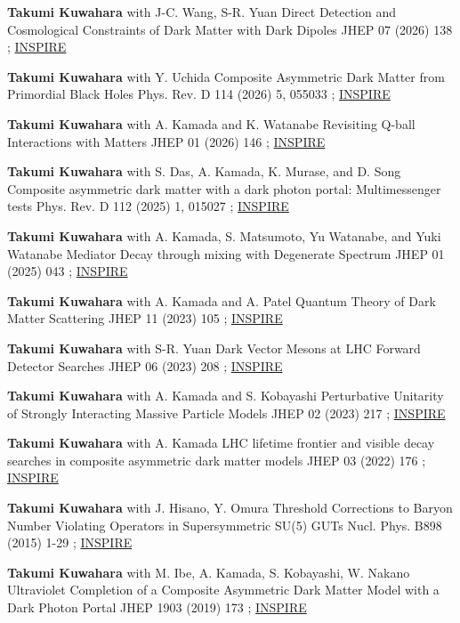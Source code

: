 \begin{publist}

\pubentry
  {\textbf{Takumi Kuwahara} with J-C. Wang, S-R. Yuan}
  {Direct Detection and Cosmological Constraints of Dark Matter with Dark Dipoles}
  {JHEP 07 (2026) 138}
  {; \href{https://inspirehep.net/literature/3117352}{INSPIRE}}

\pubentry
  {\textbf{Takumi Kuwahara} with Y. Uchida}
  {Composite Asymmetric Dark Matter from Primordial Black Holes}
  {Phys. Rev. D 114 (2026) 5, 055033}
  {; \href{https://inspirehep.net/literature/3085099}{INSPIRE}}

\pubentry
  {\textbf{Takumi Kuwahara} with A. Kamada and K. Watanabe}
  {Revisiting Q-ball Interactions with Matters}
  {JHEP 01 (2026) 146}
  {; \href{https://inspirehep.net/literature/2946508}{INSPIRE}}

\pubentry
  {\textbf{Takumi Kuwahara} with S. Das, A. Kamada, K. Murase, and D. Song}
  {Composite asymmetric dark matter with a dark photon portal: Multimessenger tests}
  {Phys. Rev. D 112 (2025) 1, 015027}
  {; \href{https://inspirehep.net/literature/2861921}{INSPIRE}}

\pubentry
  {\textbf{Takumi Kuwahara} with A. Kamada, S. Matsumoto, Yu Watanabe, and Yuki Watanabe}
  {Mediator Decay through mixing with Degenerate Spectrum}
  {JHEP 01 (2025) 043}
  {; \href{https://inspirehep.net/literature/2775864}{INSPIRE}}

\pubentry
  {\textbf{Takumi Kuwahara} with A. Kamada and A. Patel}
  {Quantum Theory of Dark Matter Scattering}
  {JHEP 11 (2023) 105}
  {; \href{https://inspirehep.net/literature/2647767}{INSPIRE}}

\pubentry
  {\textbf{Takumi Kuwahara} with S-R. Yuan}
  {Dark Vector Mesons at LHC Forward Detector Searches}
  {JHEP 06 (2023) 208}
  {; \href{https://inspirehep.net/literature/2639057}{INSPIRE}}

\pubentry
  {\textbf{Takumi Kuwahara} with A. Kamada and S. Kobayashi}
  {Perturbative Unitarity of Strongly Interacting Massive Particle Models}
  {JHEP 02 (2023) 217}
  {; \href{https://inspirehep.net/literature/2159849}{INSPIRE}}

\pubentry
  {\textbf{Takumi Kuwahara} with A. Kamada}
  {LHC lifetime frontier and visible decay searches in composite asymmetric dark matter models}
  {JHEP 03 (2022) 176}
  {; \href{https://inspirehep.net/literature/1982942}{INSPIRE}}

\pubentry
  {\textbf{Takumi Kuwahara} with J. Hisano, Y. Omura}
  {Threshold Corrections to Baryon Number Violating Operators in Supersymmetric SU(5) GUTs}
  {Nucl. Phys. B898 (2015) 1-29}
  {; \href{https://inspirehep.net/literature/1357018}{INSPIRE}}

\pubentry
  {\textbf{Takumi Kuwahara} with M. Ibe, A. Kamada, S. Kobayashi, W. Nakano}
  {Ultraviolet Completion of a Composite Asymmetric Dark Matter Model with a Dark Photon Portal}
  {JHEP 1903 (2019) 173}
  {; \href{https://inspirehep.net/literature/1705053}{INSPIRE}}

\end{publist}
